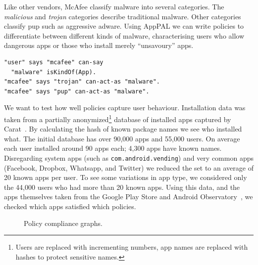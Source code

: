 \documentclass[]{llncs}
\begin{document}
Like other vendors, McAfee classify malware into several categories.
The \emph{malicious} and \emph{trojan} categories describe traditional malware.
Other categories classify \ac{pup} such as aggressive adware.
Using AppPAL we can write policies to differentiate between different kinds of malware, characterising users who allow dangerous apps or those who install merely ``unsavoury'' apps.
\begin{lstlisting}
"user" says "mcafee" can-say
  "malware" isKindOf(App).
"mcafee" says "trojan" can-act-as "malware".
"mcafee" says "pup" can-act-as "malware".
\end{lstlisting}

We want to test how well policies capture user behaviour.
Installation data was taken from a partially anonymized\footnote{Users are replaced with incrementing numbers, app names are replaced with hashes to protect sensitive names.} database of installed apps captured by Carat~\cite{Oliner:2013ht}.
By calculating the hash of known package names we see who installed what.
The initial database has over 90,000 apps and 55,000 users.
On average each user installed around 90 apps each; 4,300 apps have known names.
Disregarding system apps (such as \texttt{com.android.vending}) and very common apps (Facebook, Dropbox, Whatsapp, and Twitter) we reduced the set to an average of 20 known apps per user.
To see some variations in app type, we considered only the 44,000 users who had more than 20 known apps.
Using this data, and the apps themselves taken from the Google Play Store and Android Observatory~\cite{Barrera:2012iba}, we checked which apps satisfied which policies.

\begin{figure}\centering
  \caption{Policy compliance graphs.}
\end{figure}
\end{document}
